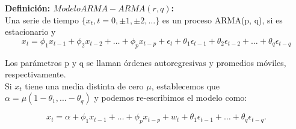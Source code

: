 %
%
%
%
\pagebreak
\begin{mdframed}[style=MyFrame]
	\begin{definition}\label{def7}
		\textbf{Definici\'on:  $Modelo ARMA - ARMA (r,q)$:}\\
Una serie de tiempo $\{x_t, t = 0, \pm1, \pm2 , \dots{} \}$ es un proceso ARMA(p, q), si es estacionario y	
\begin{equation}
x_t =  \phi_1 x_{t-1} +  \phi_2 x_{t-2} + \dots{} +  \phi_p x_{t-p} + \epsilon_t + \theta_1 \epsilon_{t-1} +  \theta_2 \epsilon_{t-2} + \dots{} +  \theta_q \epsilon_{t-q} 
\end{equation}

Los par\'ametros p y q se llaman \'ordenes autoregresivas y promedios m\'oviles, respectivamente. \\
\vspace{4mm}	
Si $x_t$ tiene una media distinta de cero $\mu$, establecemos que $\alpha = \mu (1-\theta_1, \dots{} -\theta_q)$ y podemos re-escribimos el modelo como:

\begin{equation}
x_t = \alpha + \phi_1 x_{t-1} + \dots{} + \phi_p x_{t-p} + w_t +\theta_1  \epsilon_{t-1} + \dots{} + \theta_q  \epsilon_{t-q} .
\end{equation}		
	\end{definition}
\end{mdframed}


